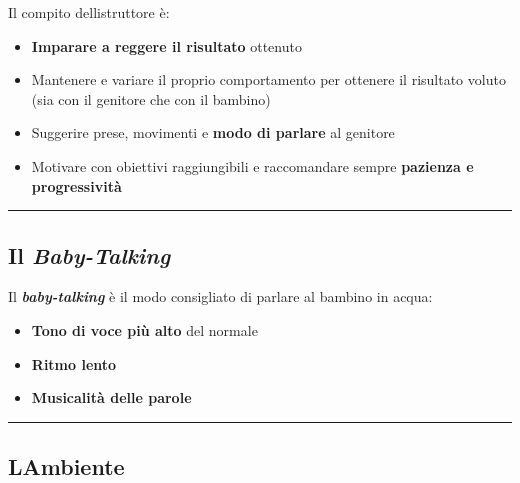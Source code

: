 \documentclass[a4paper,11pt]{article}
\providecommand{\tightlist}{%
  \setlength{\itemsep}{0pt}\setlength{\parskip}{0pt}}
\begin{document}
Il compito dell\textquotesingle istruttore è:

\begin{itemize}
      \tightlist
      \item
            \textbf{Imparare a reggere il risultato} ottenuto
      \item
            Mantenere e variare il proprio comportamento per ottenere il risultato
            voluto (sia con il genitore che con il bambino)
      \item
            Suggerire prese, movimenti e \textbf{modo di parlare} al genitore
      \item
            Motivare con obiettivi raggiungibili e raccomandare sempre
            \textbf{pazienza e progressività}
\end{itemize}

\begin{center}\rule{0.5\linewidth}{0.5pt}\end{center}

\subsection{\texorpdfstring{Il
            \emph{Baby-Talking}}{Il Baby-Talking}}\label{il-baby-talking}

Il \textbf{\emph{baby-talking}} è il modo consigliato di parlare al
bambino in acqua:

\begin{itemize}
      \tightlist
      \item
            \textbf{Tono di voce più alto} del normale
      \item
            \textbf{Ritmo lento}
      \item
            \textbf{Musicalità delle parole}
\end{itemize}

\begin{center}\rule{0.5\linewidth}{0.5pt}\end{center}

\subsection{L\textquotesingle Ambiente}\label{lambiente}
\end{document}
